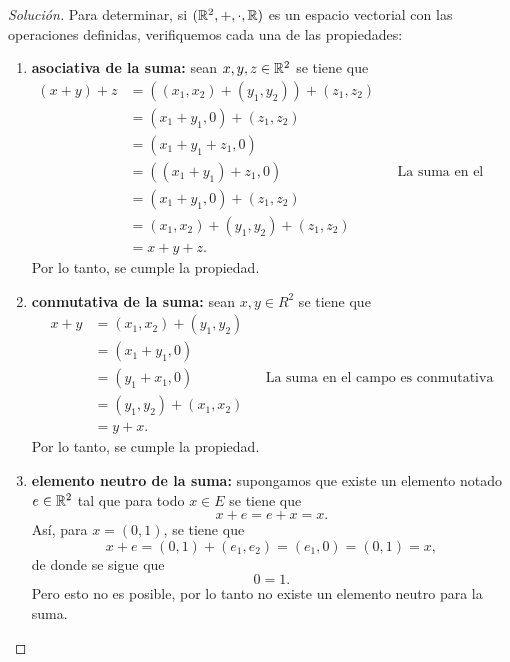 \documentclass[a4,11pt]{aleph-notas}
\begin{document}
\begin{proof}[Solución]\hspace{0pt}
    Para determinar, si $(\mathbb{R}^2,+,\cdot,\mathbb{R})$ es un espacio vectorial con las operaciones definidas, verifiquemos cada una de las propiedades:
    \begin{enumerate}
    \item \textbf{asociativa de la suma:}
        sean $x,y,z\in \mathbb{R}^2$ se tiene que
        \begin{align*}
             (x + y) + z & = ( (x_1,x_2)+(y_1,y_2)) + (z_1,z_2) \\
             & = (x_1+y_1,0) + (z_1,z_2) \\
             & = (x_1+y_1+z_1,0) \\
             & = ((x_1+y_1)+z_1,0) && \mbox{La suma en el campo es asociativa} \\
             & = (x_1+y_1,0) + (z_1,z_2) \\
             & = (x_1,x_2) + (y_1,y_2) + (z_1,z_2) \\
             & = x+y+z.
        \end{align*}
        Por lo tanto, se cumple la propiedad. 
    \item \textbf{conmutativa de la suma:}
        sean $x,y\in R^2$ se tiene que
        \begin{align*}
            x + y & = (x_1,x_2) + (y_1,y_2) \\
                & = (x_1 + y_1, 0 ) \\
                & = (y_1 + x_1, 0)  && \mbox{La suma en el campo es conmutativa}\\
                & = (y_1,y_2) + (x_1,x_2) \\
                & = y + x.
        \end{align*}
        Por lo tanto, se cumple la propiedad.
    \item \textbf{elemento neutro de la suma:}
    supongamos que existe un elemento notado $e\in\mathbb{R}^2$ tal que para todo $x\in E$ se tiene que 
    \[
        x + e = e + x = x.
    \]
    Así, para $x=(0,1)$, se tiene que 
    \[
        x + e = (0,1) + (e_1,e_2) = (e_1,0) = (0,1) = x,
    \]
    de donde se sigue que 
    \[
        0 = 1.
    \]
    Pero esto no es posible, por lo tanto no existe un elemento neutro para la suma.

\end{enumerate}
\end{proof}
\end{document}
